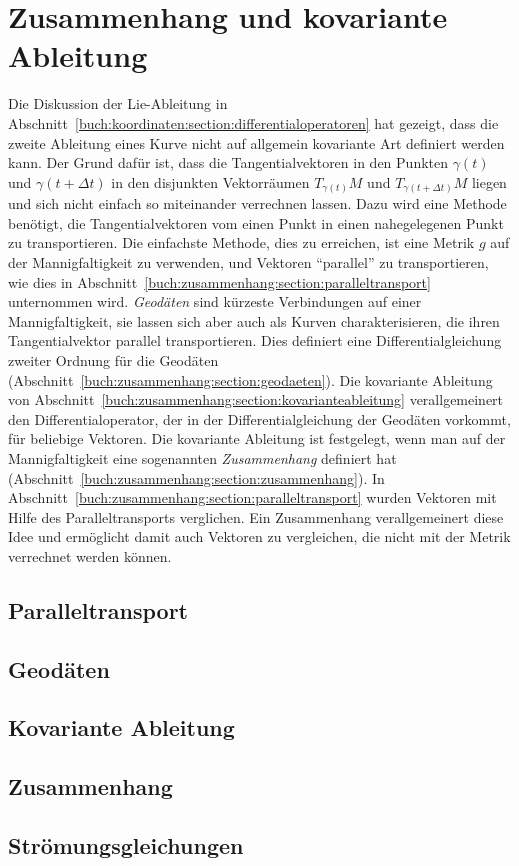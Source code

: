 %
%
%
\chapter{Zusammenhang und kovariante Ableitung
\label{chapter:zusammenhang}}

\noindent
Die Diskussion der Lie-Ableitung in
Abschnitt~\ref{buch:koordinaten:section:differentialoperatoren}
hat gezeigt, dass die zweite Ableitung eines Kurve nicht auf
allgemein kovariante Art definiert werden kann.
Der Grund dafür ist, dass die Tangentialvektoren in den Punkten
$\gamma(t)$ und $\gamma(t+\Delta t)$ in den disjunkten Vektorräumen
$T_{\gamma(t)}M$ und $T_{\gamma(t+\Delta t)}M$ liegen und sich nicht
einfach so miteinander verrechnen lassen.
Dazu wird eine Methode benötigt, die Tangentialvektoren vom einen
Punkt in einen nahegelegenen Punkt zu transportieren.
Die einfachste Methode, dies zu erreichen, ist eine Metrik $g$ auf der
Mannigfaltigkeit zu verwenden, und Vektoren ``parallel'' zu transportieren,
wie dies in Abschnitt~\ref{buch:zusammenhang:section:paralleltransport}
unternommen wird.
{\em Geodäten} sind kürzeste Verbindungen auf einer Mannigfaltigkeit, sie
lassen sich aber auch als Kurven charakterisieren, die ihren Tangentialvektor
parallel transportieren.
%
Dies definiert eine Differentialgleichung zweiter Ordnung für die
Geodäten (Abschnitt~\ref{buch:zusammenhang:section:geodaeten}).
Die kovariante Ableitung von
Abschnitt~\ref{buch:zusammenhang:section:kovarianteableitung}
verallgemeinert den Differentialoperator, der in der Differentialgleichung
der Geodäten vorkommt, für beliebige Vektoren.
Die kovariante Ableitung ist festgelegt, wenn man auf der Mannigfaltigkeit
eine sogenannten {\em Zusammenhang} definiert hat
(Abschnitt~\ref{buch:zusammenhang:section:zusammenhang}). 
%
In Abschnitt~\ref{buch:zusammenhang:section:paralleltransport} wurden
Vektoren mit Hilfe des Paralleltransports verglichen.
Ein Zusammenhang verallgemeinert diese Idee und ermöglicht damit auch
Vektoren zu vergleichen, die nicht mit der Metrik verrechnet werden
können.

\section{Paralleltransport
\label{buch:zusammenhang:section:paralleltransport}}

\section{Geodäten
\label{buch:zusammenhang:section:geodaeten}}

\section{Kovariante Ableitung
\label{buch:zusammenhang:section:kovarianteableitung}}

\section{Zusammenhang
\label{buch:zusammenhang:section:zusammenhang}}

\section{Strömungsgleichungen
\label{buch:zusammenhang:section:stroemungsgleichungen}}

